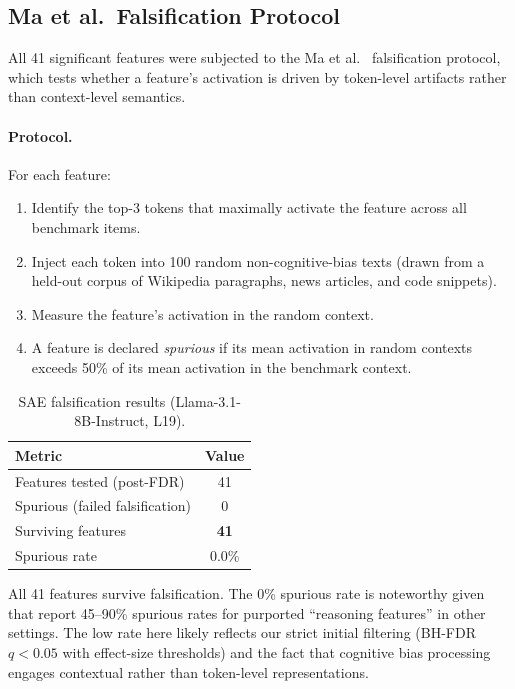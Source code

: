 \documentclass{article}
\begin{document}
\subsection{Ma et al.\ Falsification Protocol}

All 41 significant features were subjected to the Ma et al.\
\citep{ma2026falsification} falsification protocol, which tests
whether a feature's activation is driven by token-level artifacts
rather than context-level semantics.

\paragraph{Protocol.}  For each feature:
\begin{enumerate}[leftmargin=*,itemsep=2pt]
  \item Identify the top-3 tokens that maximally activate the feature
  across all benchmark items.
  \item Inject each token into 100 random non-cognitive-bias texts
  (drawn from a held-out corpus of Wikipedia paragraphs, news
  articles, and code snippets).
  \item Measure the feature's activation in the random context.
  \item A feature is declared \emph{spurious} if its mean activation
  in random contexts exceeds 50\% of its mean activation in the
  benchmark context.
\end{enumerate}

\begin{table}[ht]
\centering
\caption{SAE falsification results (Llama-3.1-8B-Instruct, L19).}
\label{tab:app_sae_falsification}
\vspace{4pt}
\small
\begin{tabular}{lc}
\toprule
\textbf{Metric} & \textbf{Value} \\
\midrule
Features tested (post-FDR)      & 41 \\
Spurious (failed falsification) & 0 \\
Surviving features              & \textbf{41} \\
Spurious rate                   & 0.0\% \\
\bottomrule
\end{tabular}
\end{table}

\noindent All 41 features survive falsification.  The 0\% spurious
rate is noteworthy given that \citet{meloux2025dead} report
45--90\% spurious rates for purported ``reasoning features'' in other
settings.  The low rate here likely reflects our strict initial
filtering (BH-FDR $q < 0.05$ with effect-size thresholds) and the
fact that cognitive bias processing engages contextual rather than
token-level representations.
\end{document}
